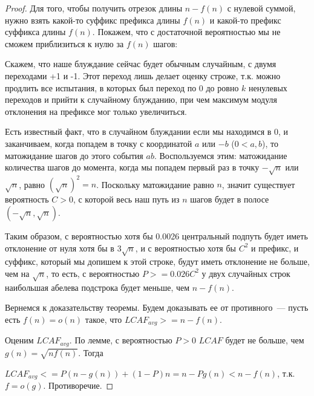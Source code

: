 \begin{proof}
Для того, чтобы получить отрезок длины $n-f(n)$ с нулевой суммой, нужно взять какой-то суффикс префикса длины $f(n)$ и какой-то префикс суффикса длины $f(n)$. Покажем, что с достаточной вероятностью мы не сможем приблизиться к нулю за $f(n)$ шагов:

Скажем, что наше блуждание сейчас будет обычным случайным, с двумя переходами +1 и -1. Этот переход лишь делает оценку строже, т.к. можно продлить все испытания, в которых был переход по 0 до ровно $k$ ненулевых переходов и прийти к случайному блужданию, при чем максимум модуля отклонения на префиксе мог только увеличиться.

Есть известный факт, что в случайном блуждании если мы находимся в 0, и заканчиваем, когда попадем в точку с координатой $a$ или $-b$ ($0 < a, b$), то матожидание шагов до этого события $ab$. Воспользуемся этим: матожидание количества шагов до момента, когда мы попадем первый раз в точку $-\sqrt n$ или $\sqrt n$, равно $(\sqrt n)^2=n$. Поскольку матожидание равно $n$, значит существует вероятность $C>0$, с которой весь наш путь из $n$ шагов будет в полосе $(-\sqrt n, \sqrt n)$. %

Таким образом, с вероятностью хотя бы 0.0026 центральный подпуть будет иметь отклонение от нуля хотя бы в $3\sqrt n$, и с вероятностью хотя бы $C^2$ и префикс, и суффикс, который мы допишем к этой строке, будут иметь отклонение не больше, чем на $\sqrt n$, то есть, с вероятностью $P>=0.026C^2$ у двух случайных строк наибольшая абелева подстрока будет меньше, чем $n-f(n)$.

Вернемся к доказательству теоремы. Будем доказывать ее от противного~--- пусть есть $f(n)=o(n)$ такое, что $LCAF_{avg} >= n - f(n)$. 

Оценим $LCAF_{avg}$. По лемме, с вероятностью $P>0$ $LCAF$ будет не больше, чем $g(n)=\sqrt{nf(n)}$. Тогда

$LCAF_{avg} <= P (n-g(n)) + (1-P)n = n-Pg(n) < n - f(n)$, т.к. $f=o(g)$. Противоречие.

\end{proof}


